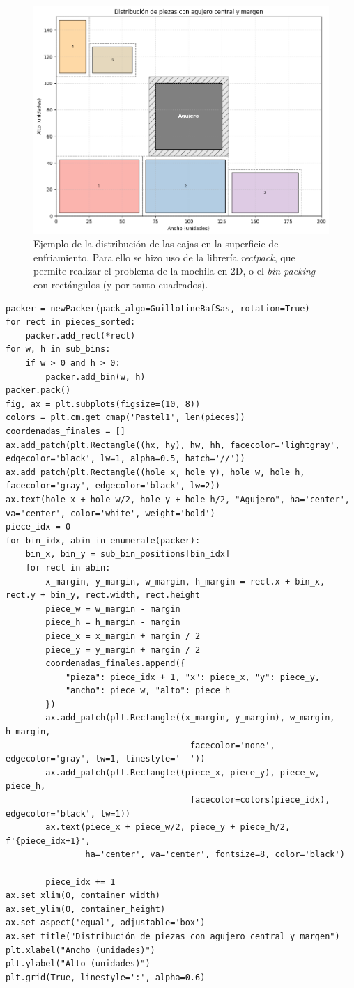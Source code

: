 \begin{figure}[H]
    \centering
    \includegraphics[width=0.6\linewidth]{figuras/ejemplo_packaging.png}
    \caption[Ejemplo distribución de superficie]{Ejemplo de la distribución de las cajas en la superficie de enfriamiento. Para ello se hizo uso de la librería \textit{rectpack}, que permite realizar el problema de la mochila en 2D, o el \textit{bin packing} con rectángulos (y por tanto cuadrados).}
    \label{fig:ejemplopackaging}
\end{figure}
%
\begin{lstlisting}[caption={Código de implementación del problema de distribución de piezas.}, label={distribucion_piezas}]
    packer = newPacker(pack_algo=GuillotineBafSas, rotation=True)
for rect in pieces_sorted:
    packer.add_rect(*rect)
for w, h in sub_bins:
    if w > 0 and h > 0:
        packer.add_bin(w, h)
packer.pack()
fig, ax = plt.subplots(figsize=(10, 8))
colors = plt.cm.get_cmap('Pastel1', len(pieces))
coordenadas_finales = []
ax.add_patch(plt.Rectangle((hx, hy), hw, hh, facecolor='lightgray', edgecolor='black', lw=1, alpha=0.5, hatch='//'))
ax.add_patch(plt.Rectangle((hole_x, hole_y), hole_w, hole_h, facecolor='gray', edgecolor='black', lw=2))
ax.text(hole_x + hole_w/2, hole_y + hole_h/2, "Agujero", ha='center', va='center', color='white', weight='bold')
piece_idx = 0
for bin_idx, abin in enumerate(packer):
    bin_x, bin_y = sub_bin_positions[bin_idx]
    for rect in abin:
        x_margin, y_margin, w_margin, h_margin = rect.x + bin_x, rect.y + bin_y, rect.width, rect.height
        piece_w = w_margin - margin
        piece_h = h_margin - margin
        piece_x = x_margin + margin / 2
        piece_y = y_margin + margin / 2
        coordenadas_finales.append({
            "pieza": piece_idx + 1, "x": piece_x, "y": piece_y,
            "ancho": piece_w, "alto": piece_h
        })
        ax.add_patch(plt.Rectangle((x_margin, y_margin), w_margin, h_margin,
                                     facecolor='none', edgecolor='gray', lw=1, linestyle='--'))
        ax.add_patch(plt.Rectangle((piece_x, piece_y), piece_w, piece_h,
                                     facecolor=colors(piece_idx), edgecolor='black', lw=1))
        ax.text(piece_x + piece_w/2, piece_y + piece_h/2, f'{piece_idx+1}', 
                ha='center', va='center', fontsize=8, color='black')
        
        piece_idx += 1
ax.set_xlim(0, container_width)
ax.set_ylim(0, container_height)
ax.set_aspect('equal', adjustable='box')
ax.set_title("Distribución de piezas con agujero central y margen")
plt.xlabel("Ancho (unidades)")
plt.ylabel("Alto (unidades)")
plt.grid(True, linestyle=':', alpha=0.6)
\end{lstlisting}
%
%
